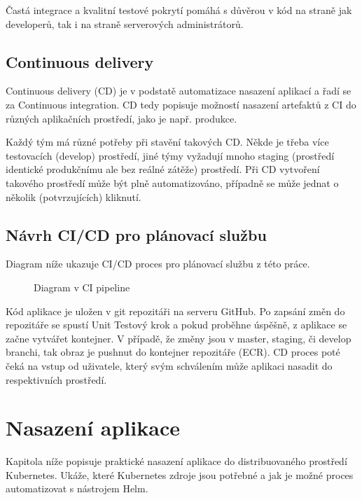 \documentclass[thesis=M,czech]{FITthesis}[2019/12/23]
\theoremstyle{plain}
\theoremstyle{definition}
\begin{document}
Častá integrace a kvalitní testové pokrytí pomáhá s důvěrou v kód na straně jak developerů, tak i na straně serverových administrátorů. 

\subsection{Continuous delivery}

Continuous delivery (CD) je v podstatě automatizace nasazení aplikací a řadí se za Continuous integration. CD tedy popisuje možností nasazení artefaktů z CI do různých aplikačních prostředí, jako je např. produkce.\cite{humble-ci}

Každý tým má různé potřeby při stavění takových CD. Někde je třeba více testovacích (develop) prostředí, jiné týmy vyžadují mnoho staging (prostředí identické produkčnímu ale bez reálné zátěže) prostředí. Při CD vytvoření takového prostředí může být plně automatizováno, případně se může jednat o několik (potvrzujících) kliknutí.


\subsection{Návrh CI/CD pro plánovací službu}

Diagram níže ukazuje CI/CD proces pro plánovací službu z této práce.



\begin{figure}[H]\centering
	

	\caption[Diagram v CI pipeline]{Diagram v CI pipeline}\label{fig:float}
\end{figure}

Kód aplikace je uložen v git repozitáři na serveru GitHub. Po zapsání změn do repozitáře se spustí Unit Testový krok a pokud proběhne úspěšně, z aplikace se začne vytvářet kontejner. V případě, že změny jsou v master, staging, či develop branchi, tak obraz je pushnut do kontejner repozitáře (ECR). CD proces poté čeká na vstup od uživatele, který svým schválením může aplikaci nasadit do respektivních prostředí.


\section{Nasazení aplikace}

Kapitola níže popisuje praktické nasazení aplikace do distribuovaného prostředí Kubernetes. Ukáže, které Kubernetes zdroje jsou potřebné a jak je možné proces automatizovat s nástrojem Helm. 
\end{document}
